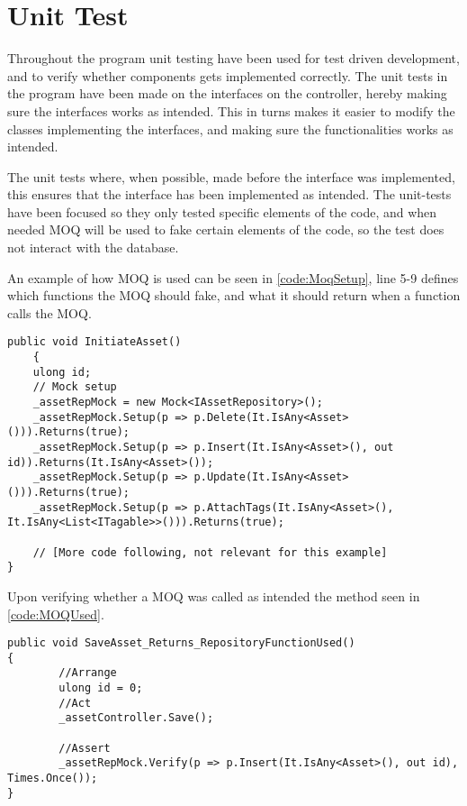 \section{Unit Test} \label{sc:UnitTest}
Throughout the program unit testing have been used for test driven development, and to verify whether components gets implemented correctly. The unit tests in the program have been made on the interfaces on the controller, hereby making sure the interfaces works as intended. This in turns makes it easier to modify the classes implementing the interfaces, and making sure the functionalities works as intended. \par

The unit tests where, when possible, made before the interface was implemented, this ensures that the interface has been implemented as intended. The unit-tests have been focused so they only tested specific elements of the code, and when needed MOQ \citep{MoqReference} will be used to fake certain elements of the code, so the test does not interact with the database. \par

An example of how MOQ is used can be seen in \autoref{code:MoqSetup}, line 5-9 defines which functions the MOQ should fake, and what it should return when a function calls the MOQ.

\begin{listing}[H]
\begin{verbatim}
public void InitiateAsset()
    {
    ulong id;
    // Mock setup
    _assetRepMock = new Mock<IAssetRepository>();
    _assetRepMock.Setup(p => p.Delete(It.IsAny<Asset>())).Returns(true);
    _assetRepMock.Setup(p => p.Insert(It.IsAny<Asset>(), out id)).Returns(It.IsAny<Asset>());
    _assetRepMock.Setup(p => p.Update(It.IsAny<Asset>())).Returns(true);
    _assetRepMock.Setup(p => p.AttachTags(It.IsAny<Asset>(), It.IsAny<List<ITagable>>())).Returns(true);
    
    // [More code following, not relevant for this example]
}
\end{verbatim}
\label{code:MoqSetup}
\end{listing}
\par
Upon verifying whether a MOQ was called as intended the method seen in \autoref{code:MOQUsed}.

\begin{listing}[H]
\begin{verbatim}
public void SaveAsset_Returns_RepositoryFunctionUsed()
{
        //Arrange
        ulong id = 0;
        //Act
        _assetController.Save();

        //Assert
        _assetRepMock.Verify(p => p.Insert(It.IsAny<Asset>(), out id), Times.Once());
}
\end{verbatim}
\label{code:MOQUsed}
\end{listing}

